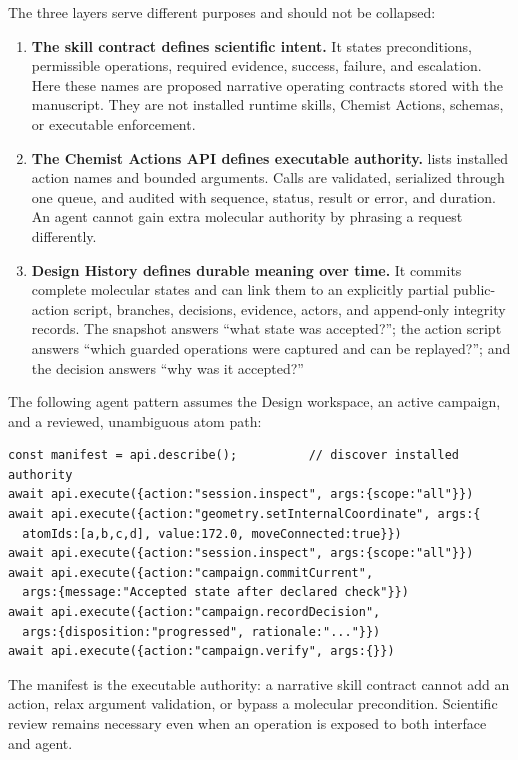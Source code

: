\documentclass[11pt]{article}
\begin{document}
The three layers serve different purposes and should not be collapsed:

\begin{enumerate}
\item \textbf{The skill contract defines scientific intent.} It states preconditions, permissible operations, required evidence, success, failure, and escalation. Here these names are proposed narrative operating contracts stored with the manuscript. They are not installed runtime skills, Chemist Actions, schemas, or executable enforcement.
\item \textbf{The Chemist Actions API defines executable authority.}  lists installed action names and bounded arguments. Calls are validated, serialized through one queue, and audited with sequence, status, result or error, and duration. An agent cannot gain extra molecular authority by phrasing a request differently.
\item \textbf{Design History defines durable meaning over time.} It commits complete molecular states and can link them to an explicitly partial public-action script, branches, decisions, evidence, actors, and append-only integrity records. The snapshot answers ``what state was accepted?''; the action script answers ``which guarded operations were captured and can be replayed?''; and the decision answers ``why was it accepted?''
\end{enumerate}

The following agent pattern assumes the Design workspace, an active campaign, and a reviewed, unambiguous atom path:

\begin{lstlisting}
const manifest = api.describe();          // discover installed authority
await api.execute({action:"session.inspect", args:{scope:"all"}})
await api.execute({action:"geometry.setInternalCoordinate", args:{
  atomIds:[a,b,c,d], value:172.0, moveConnected:true}})
await api.execute({action:"session.inspect", args:{scope:"all"}})
await api.execute({action:"campaign.commitCurrent",
  args:{message:"Accepted state after declared check"}})
await api.execute({action:"campaign.recordDecision",
  args:{disposition:"progressed", rationale:"..."}})
await api.execute({action:"campaign.verify", args:{}})
\end{lstlisting}

The manifest is the executable authority: a narrative skill contract cannot add an action, relax argument validation, or bypass a molecular precondition. Scientific review remains necessary even when an operation is exposed to both interface and agent.
\end{document}
